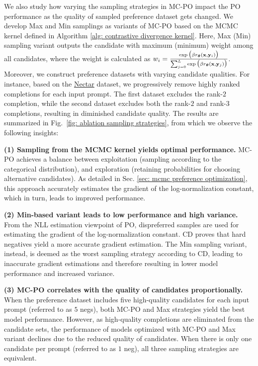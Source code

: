 We also study how varying the sampling strategies in MC-PO impact the PO performance as the quality of sampled preference dataset gets changed.
We develop Max and Min samplings as variants of MC-PO based on the MCMC kernel defined in Algorithm \ref{alg: contrastive divergence kernel}. Here, 
Max (Min) sampling variant outputs the candidate with maximum (minimum) weight among all candidates,
where the weight is calculated as 
$
w_i = \frac{\exp 
\big(
\beta
r_{\boldsymbol\theta}(\mathbf{x}, \mathbf{y}_i)
\big)} {\sum_{j=0}^L \exp 
\big(
\beta
r_{\boldsymbol\theta}(\mathbf{x}, \mathbf{y}_j)
\big)}
$.
Moreover,
we construct preference datasets with varying candidate qualities. For instance, based on the \href{https://huggingface.co/datasets/berkeley-nest/Nectar}{Nectar} dataset, we progressively remove highly ranked completions for each input prompt. 
The first dataset excludes the rank-$2$ completion, while the second dataset excludes both the rank-$2$ and rank-$3$ completions, resulting in diminished candidate quality.
The results are summarized in Fig.~\ref{fig: ablation sampling strategies},
from which we observe the following insights:


\textbf{(1) Sampling from the MCMC kernel yields optimal performance.}
MC-PO achieves a balance between exploitation (sampling according to the categorical distribution), and exploration  
(retaining probabilities for choosing alternative candidates). As detailed in Sec. \ref{sec: mcmc preference optimization}, this approach accurately estimates the gradient of the log-normalization constant, which in turn, leads to improved  performance.

\textbf{(2) Min-based variant leads to low performance and high variance.}
From the NLL estimation viewpoint of PO, dispreferred samples are used for estimating the gradient of the log-normalization constant. 
CD proves that hard negatives yield a more accurate gradient estimation. 
The Min sampling variant, instead, is deemed as the worst sampling strategy according to CD, 
leading to inaccurate gradient estimations and therefore resulting in lower model performance and increased variance.

\textbf{(3) MC-PO correlates with the quality of candidates proportionally.}
When the preference dataset includes five high-quality candidates for each input prompt (referred to as $5$ negs), both MC-PO and Max strategies yield the best model performance. 
However, as high-quality completions are eliminated from the candidate sets, the performance of models optimized with MC-PO and Max variant declines due to the reduced quality of candidates. 
When there is only one candidate per prompt (referred to as $1$ neg), all three sampling strategies are equivalent.





